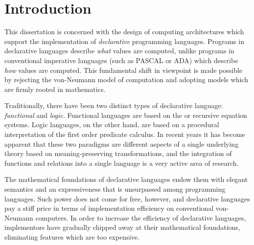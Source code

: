 \chapter{Introduction}

This dissertation is concerned with the design of computing architectures which
support the implementation of \emph{declarative} programming languages. Programs
in declarative languages describe \emph{what} values are computed, unlike
programs in conventional imperative languages (such as PASCAL or ADA) which
describe \emph{how} values are computed. This fundamental shift in viewpoint is
made possible by rejecting the von-Neumann model of computation and adopting
models which are firmly rooted in mathematics.

Traditionally, there have been two distinct types of declarative language:
\emph{functional} and \emph{logic}. Functional languages are based on the
\lambdacalculus{} or recursive equation systems. Logic languages, on the other
hand, are based on a procedural interpretation of the first order predicate
calculus. In recent years it has become apparent that these two paradigms are
different aspects of a single underlying theory based on meaning-preserving
transformations, and the integration of functions and relations into a single
language is a very active area of research.

The mathematical foundations of declarative languages endow them with elegant
semantics and an expressiveness that is unsurpassed among programming languages.
Such power does not come for free, however, and declarative languages pay a stiff
price in terms of implementation efficiency on conventional von-Neumann
computers. In order to increase the efficiency of declarative languages,
implementors have gradually chipped away at their mathematical foundations,
eliminating features which are too expensive.

